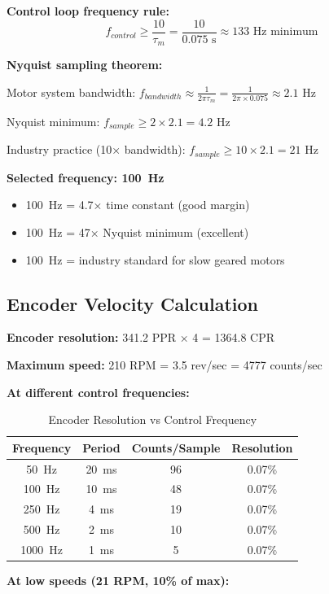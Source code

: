 \textbf{Control loop frequency rule:}
\begin{equation}
f_{control} \geq \frac{10}{\tau_m} = \frac{10}{0.075 \text{ s}} \approx 133 \text{ Hz minimum}
\end{equation}

\textbf{Nyquist sampling theorem:}

Motor system bandwidth: $f_{bandwidth} \approx \frac{1}{2\pi\tau_m} = \frac{1}{2\pi \times 0.075} \approx 2.1$ Hz

Nyquist minimum: $f_{sample} \geq 2 \times 2.1 = 4.2$ Hz

Industry practice (10× bandwidth): $f_{sample} \geq 10 \times 2.1 = 21$ Hz

\textbf{Selected frequency: 100~Hz}
\begin{itemize}
    \item 100~Hz = 4.7× time constant (good margin)
    \item 100~Hz = 47× Nyquist minimum (excellent)
    \item 100~Hz = industry standard for slow geared motors
\end{itemize}

\subsection{Encoder Velocity Calculation}

\textbf{Encoder resolution:} 341.2 PPR × 4 = 1364.8 CPR

\textbf{Maximum speed:} 210 RPM = 3.5 rev/sec = 4777 counts/sec

\textbf{At different control frequencies:}

\begin{table}[H]
\centering
\caption{Encoder Resolution vs Control Frequency}
\begin{tabular}{cccc}
\toprule
\textbf{Frequency} & \textbf{Period} & \textbf{Counts/Sample} & \textbf{Resolution} \\
\midrule
50~Hz & 20~ms & 96 & 0.07\% \\
100~Hz & 10~ms & 48 & 0.07\% \\
250~Hz & 4~ms & 19 & 0.07\% \\
500~Hz & 2~ms & 10 & 0.07\% \\
1000~Hz & 1~ms & 5 & 0.07\% \\
\bottomrule
\end{tabular}
\end{table}

\textbf{At low speeds (21 RPM, 10\% of max):}

